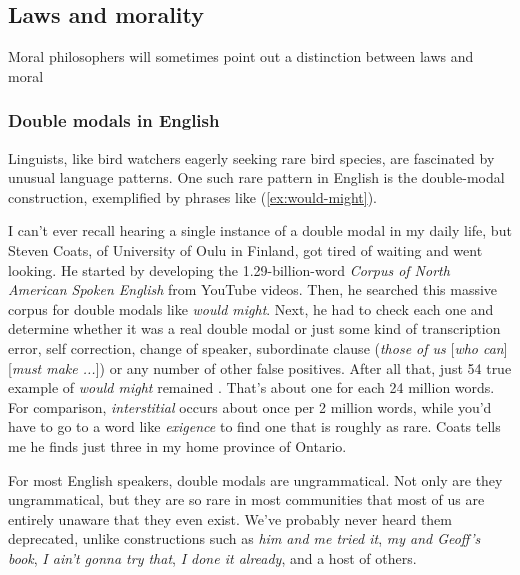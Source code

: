 \subsection{Laws and morality}

Moral philosophers will sometimes point out a distinction between laws and moral

\subsubsection{Double modals in English}

Linguists, like bird watchers eagerly seeking rare bird species, are fascinated by unusual language patterns. One such rare pattern in English is the double-modal construction, exemplified by phrases like (\ref{ex:would-might}).

\label{ex:would-might}
\z 

I can't ever recall hearing a single instance of a double modal in my daily life, but Steven Coats, of University of Oulu in Finland, got tired of waiting and went looking. He started by developing the 1.29-billion-word \textit{Corpus of North American Spoken English} \citep{Coats2023} from YouTube videos. Then, he searched this massive corpus for double modals like \textit{would might}. Next, he had to check each one and determine whether it was a real double modal or just some kind of transcription error, self correction, change of speaker, subordinate clause (\textit{those of us }[\textit{who can}] [\textit{must make ...}]) or any number of other false positives. After all that, just 54 true example of \textit{would might} remained \citep{Coats2022}. That's about one for each 24 million words. For comparison, \textit{interstitial} occurs about once per 2 million words, while you'd have to go to a word like \textit{exigence} to find one that is roughly as rare. Coats tells me he finds just three in my home province of Ontario.

For most English speakers, double modals are ungrammatical. Not only are they ungrammatical, but they are so rare in most communities that most of us are entirely unaware that they even exist. We've probably never heard them deprecated, unlike constructions such as \textit{him and me tried it}, \textit{my and Geoff's book}, \textit{I ain't gonna try that}, \textit{I done it already}, and a host of others.

